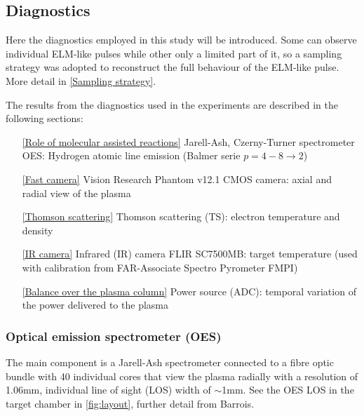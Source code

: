 \subsection{Diagnostics}\label{Diagnostics}

Here the diagnostics employed in this study will be introduced. Some can observe individual ELM-like pulses while other only a limited part of it, so a sampling strategy was adopted to reconstruct the full behaviour of the ELM-like pulse. More detail in \autoref{Sampling strategy}.

The results from the diagnostics used in the experiments are described in the following sections:
\begin{enumerate}
    \item[\ref{Role of molecular assisted reactions}] Jarell-Ash, Czerny-Turner spectrometer OES: Hydrogen atomic line emission (Balmer serie $p=4-8 \rightarrow 2$)
    \item[\ref{Fast camera}] Vision Research Phantom v12.1 CMOS camera: axial and radial view of the plasma
    \item[\ref{Thomson scattering}] Thomson scattering (TS): electron temperature and density
    \item[\ref{IR camera}] Infrared (IR) camera FLIR SC7500MB: target temperature (used with calibration from FAR-Associate Spectro Pyrometer FMPI)
    \item[\ref{Balance over the plasma column}] Power source (ADC): temporal variation of the power delivered to the plasma
\end{enumerate}

\subsubsection{Optical emission spectrometer (OES)}\label{Optical emission spectrometer}

The main component is a Jarell-Ash spectrometer connected to a fibre optic bundle with 40 individual cores that view the plasma radially with a resolution of 1.06mm, individual line of sight (LOS) width of $\sim$1mm. See the OES LOS in the target chamber in \autoref{fig:layout}, further detail from Barrois. \cite{Science2017}

